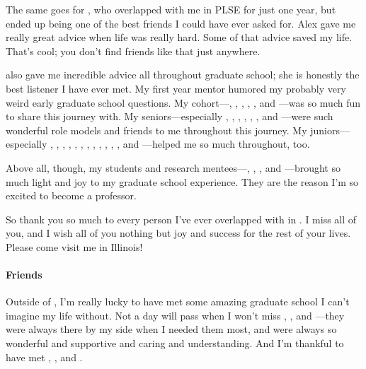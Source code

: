 The same goes for , who overlapped with me in PLSE for just one year,
but ended up being one of the best friends I could have ever asked for.
Alex gave me really great advice when life was really hard.
Some of that advice saved my life.
That's cool; you don't find friends like that just anywhere.

 also gave me incredible advice all throughout graduate school; she is honestly the best listener I have ever met.
My first year mentor  humored my probably very weird early graduate school questions.
My cohort---, , , , 
, and ---was so much fun to share this journey with.
My seniors---especially , , , , , 
, and ---were such wonderful role models and friends to me throughout this journey.
My juniors---especially , , ,
, %
, %
, %
, %
, %
, %
,
,
,
and ---helped me so much throughout, too.

Above all, though, my students and research mentees---, , , and ---brought
so much light and joy to my graduate school experience.
They are the reason I'm so excited to become a professor.

So thank you so much to every person I've ever overlapped with in .
I miss all of you, and I wish all of you nothing but joy and success for the rest of your lives.
Please come visit me in Illinois!

\paragraph{Friends}
Outside of , I'm really lucky to have met some amazing graduate school  I can't imagine my life without.
Not a day will pass when I won't miss , , and ---they were always
there by my side when I needed them most,
and were always so wonderful and supportive and caring and understanding.
And I'm thankful to have met , , and .

